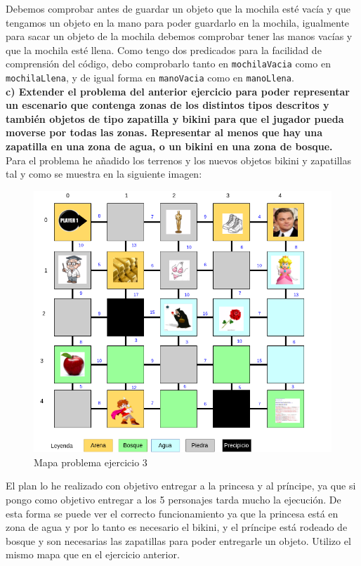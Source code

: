 \documentclass[12pt]{article}
\begin{document}
Debemos comprobar antes de guardar un objeto que la mochila esté vacía y que tengamos un objeto en la mano para poder guardarlo en la mochila, igualmente para sacar un objeto de la mochila debemos comprobar tener las manos vacías y que la mochila esté llena. Como tengo dos predicados para la facilidad de comprensión del código, debo comprobarlo tanto en \texttt{mochilaVacia} como en \texttt{mochilaLlena}, y de igual forma en \texttt{manoVacia} como en \texttt{manoLlena}.\\


\textbf{c) Extender el problema del anterior ejercicio para poder representar un escenario que contenga zonas de los distintos tipos descritos y también objetos de tipo zapatilla y bikini para que el jugador pueda moverse por todas las zonas. Representar al menos que hay una zapatilla en una zona de agua, o un bikini en una zona de bosque.}\\

Para el problema he añadido los terrenos y los nuevos objetos bikini y zapatillas tal y como se muestra en la siguiente imagen:


\begin{figure}[H] 
	\centering
	\includegraphics[width=15cm]{Ej3_1.png}
	\caption{Mapa problema ejercicio 3}
\end{figure}

El plan lo he realizado con objetivo entregar a la princesa y al príncipe, ya que si pongo como objetivo entregar a los 5 personajes tarda mucho la ejecución. De esta forma se puede ver el correcto funcionamiento ya que la princesa está en zona de agua y por lo tanto es necesario el bikini, y el príncipe está rodeado de bosque y son necesarias las zapatillas para poder entregarle un objeto. Utilizo el mismo mapa que en el ejercicio anterior.
\end{document}
